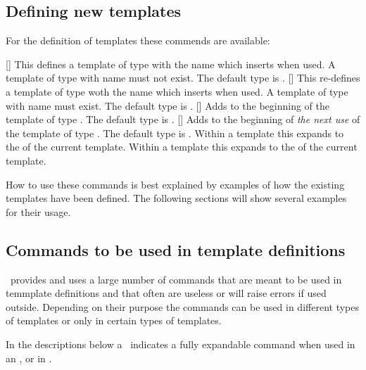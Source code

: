 \documentclass{acro-manual}
\begin{document}
\subsection{Defining new templates}\label{sec:defin-new-templ}
For the definition of templates these commends are available:
\begin{commands}
  []
    This defines a template of type  with the name 
    which inserts  when used.  A template of type  with
    name  must not exist.  The default type is .
  []
    This re-defines a template of type  woth the name 
    which inserts  when used.  A template of type  with
    name  must exist.  The default type is .
  []
    Adds  to the beginning of the template
     of type .  The default type is .
  []
    Adds  to the beginning of \emph{the next use}
    of the template  of type .  The default type is
    .
  \expandable{}
    Within a template this expands to the  of the current
    template.
  \expandable{}
    Within a template this expands to the  of the current
    template.
\end{commands}

How to use these commands is best explained by examples of how the existing
templates have been defined.  The following sections will show several
examples for their usage.

\subsection{Commands to be used in template definitions}

\acro\ provides and uses a large number of commands that are meant to be used
in temmplate definitions and that often are useless or will raise errors if
used outside.  Depending on their purpose the commands can be used in
different types of templates or only in certain types of templates.

In the descriptions below a \expandablesymbol\ indicates a fully expandable
command when used in an ,  or in .
\end{document}
